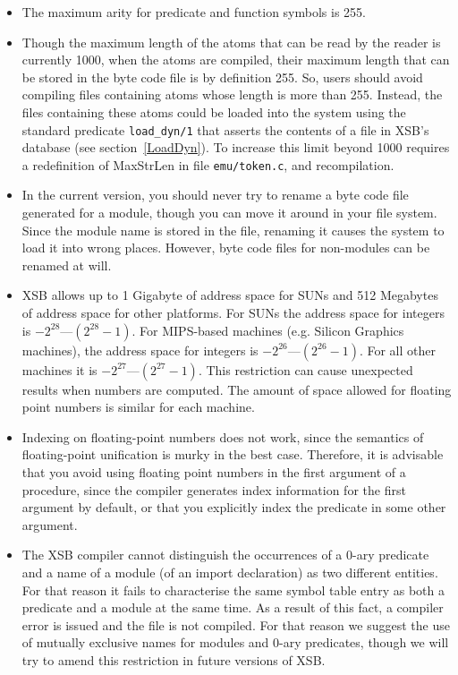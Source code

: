 \begin{itemize}
\item	The maximum arity for predicate and function symbols is 255.
%
\item	Though the maximum length of the atoms that can be read by the 
      reader is currently 1000, when the atoms are compiled, their
      maximum length that can be stored in the byte code file is by
      definition 255.  So, users should avoid compiling files
      containing atoms whose length is more than 255.  Instead, the
      files containing these atoms could be loaded into the system
      using the standard predicate {\tt load\_dyn/1} that asserts the
      contents of a file in XSB's database (see
      section~\ref{LoadDyn}). To increase this limit beyond 1000
      requires a redefinition of MaxStrLen in file {\tt emu/token.c},
      and recompilation.
%
\item	In the current version, you should never try to rename a byte code 
      file generated for a module, though you can move it around in your 
      file system.  Since the module name is stored in the file, renaming it
      causes the system to load it into wrong places.  However, byte code 
      files for non-modules can be renamed at will.
%
\item	XSB allows up to 1 Gigabyte of address space for SUNs and 512
      Megabytes of address space for other platforms.  For SUNs the
      address space for integers is $-2^{28}$---$(2^{28}-1)$.  For
      MIPS-based machines (e.g. Silicon Graphics machines), the
      address space for integers is $-2^{26}$---$(2^{26}-1)$.  For all
      other machines it is $-2^{27}$---$(2^{27}-1)$.  This restriction can
      cause unexpected results when numbers are computed.  The amount
      of space allowed for floating point numbers is similar for each
      machine.
%
\item	Indexing on floating-point numbers does not work, since the semantics
      of floating-point unification is murky in the best case. Therefore, it
      is advisable that you avoid using floating point numbers in the first 
      argument of a procedure, since the compiler generates index information 
      for the first argument by default, or that you explicitly index the
      predicate in some other argument.
%
\item	The XSB compiler cannot distinguish the occurrences of a
      0-ary predicate and a name of a module (of an import declaration) as
      two different entities.  For that reason it fails to characterise the
      same symbol table entry as both a predicate and a module at the
      same time.  As a result of this fact, a compiler error is issued
      and the file is not compiled.  For that reason we suggest the
      use of mutually exclusive names for modules and 0-ary predicates,
      though we will try to amend this restriction in future versions of
      XSB.
\end{itemize}

